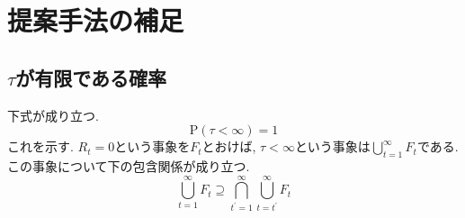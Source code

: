 \chapter{提案手法の補足}

\section{$ \tau $が有限である確率}
下式が成り立つ. 
\begin{equation}
    \mathrm{P}(\tau < \infty) = 1
\end{equation}
これを示す. $ R_t = 0 $という事象を$ F_t $とおけば, $ \tau < \infty $という事象は$ \bigcup_{t=1}^{\infty} F_t $である. 
この事象について下の包含関係が成り立つ. 
\begin{equation} \label{eq:UFt}
    \bigcup_{t=1}^{\infty} F_t \supseteq \bigcap_{t^{\prime}=1}^{\infty} \bigcup_{t=t^{\prime}}^{\infty} F_t
\end{equation}


